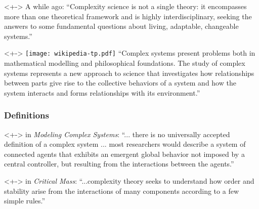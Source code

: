 \begin{frame}

  \begin{block}<+->{
      A while ago:
    }
    ``Complexity science is not a single theory: 
    it encompasses more than one theoretical framework and is highly
    interdisciplinary, seeking the answers to some fundamental questions
    about living, adaptable, changeable systems.''
  \end{block}

  \begin{block}<+->{
      \hfill \texttt{[image: wikipedia-tp.pdf]} 
    }   
    ``Complex systems present problems both in mathematical modelling
and philosophical foundations. The study of complex systems represents
a new approach to science that investigates how relationships between
parts give rise to the collective behaviors of a system and how the
system interacts and forms relationships with its environment.''
  \end{block}

\end{frame}


\begin{frame}
  \frametitle{Definitions}

  \begin{block}<+->{
       in \textit{Modeling Complex Systems}:}\cite{boccara2004a}
    ``... there is no universally accepted definition
    of a complex system ... most researchers would describe
    a system of connected agents that exhibits
    an emergent global behavior not imposed by a central
    controller, but resulting from the interactions between
    the agents.''
  \end{block}

  \begin{block}<+->{ in \textit{Critical Mass}:}\cite{ball2004a}
    ``...complexity theory seeks to understand how order and 
    stability arise from the interactions of many components
    according to a few simple rules.''
  \end{block}


\end{frame}


